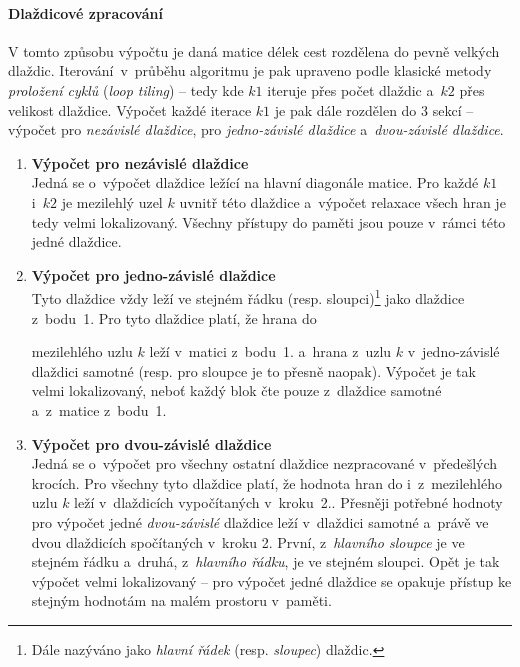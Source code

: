 \paragraph{Dlaždicové zpracování}
V tomto způsobu výpočtu je daná matice délek cest rozdělena do pevně velkých dlaždic. Iterování~v~průběhu algoritmu je pak
upraveno podle klasické metody \emph{proložení cyklů} (\emph{loop tiling}) -- tedy kde $k1$ iteruje přes počet dlaždic 
a~$k2$ přes velikost dlaždice. Výpočet každé iterace $k1$ je pak dále rozdělen do
3 sekcí -- výpočet pro \emph{nezávislé dlaždice}, pro \emph{jedno-závislé dlaždice} a~\emph{dvou-závislé dlaždice}.
\begin{enumerate}
    \item \textbf{Výpočet pro nezávislé dlaždice} \label{cuda:dlazdice:nezavisle} \\
        Jedná se o~výpočet dlaždice ležící na hlavní diagonále matice. Pro každé $k1$ i~$k2$ je mezilehlý uzel $k$ uvnitř této
        dlaždice a~výpočet relaxace všech hran je tedy velmi lokalizovaný. Všechny přístupy do paměti jsou pouze v~rámci této jedné dlaždice.

    \item \textbf{Výpočet pro jedno-závislé dlaždice} \label{cuda:dlazdice:jednozavisle} \\ 
        Tyto dlaždice vždy leží ve stejném řádku (resp. sloupci)\footnote{Dále nazýváno jako \emph{hlavní řádek} (resp.
        \emph{sloupec}) dlaždic.} jako dlaždice z~bodu~1. Pro tyto dlaždice platí, že hrana do 


        mezilehlého uzlu $k$ leží v~matici z~bodu~1. a~hrana z~uzlu $k$ v~jedno-závislé dlaždici samotné (resp. pro sloupce je to 
        přesně naopak). Výpočet je tak velmi lokalizovaný, neboť každý blok čte pouze z~dlaždice samotné a~z~matice z~bodu~1.

    \item \textbf{Výpočet pro dvou-závislé dlaždice} \label{cuda:dlazdice:dvouzavisle} \\
        Jedná se o~výpočet pro všechny ostatní dlaždice nezpracované v~předešlých krocích. Pro všechny tyto dlaždice platí, že 
        hodnota hran do i~z~mezilehlého uzlu $k$ leží v~dlaždicích vypočítaných v~kroku~2.. Přesněji potřebné hodnoty pro výpočet
        jedné \emph{dvou-závislé} dlaždice leží v~dlaždici samotné a~právě ve dvou dlaždicích spočítaných v~kroku 2. První, 
        z~\emph{hlavního sloupce} je ve stejném řádku a~druhá, z~\emph{hlavního řádku}, je ve stejném sloupci. Opět je tak 
        výpočet velmi lokalizovaný -- pro výpočet jedné dlaždice se opakuje přístup ke stejným hodnotám na malém prostoru v~paměti.

\end{enumerate}

